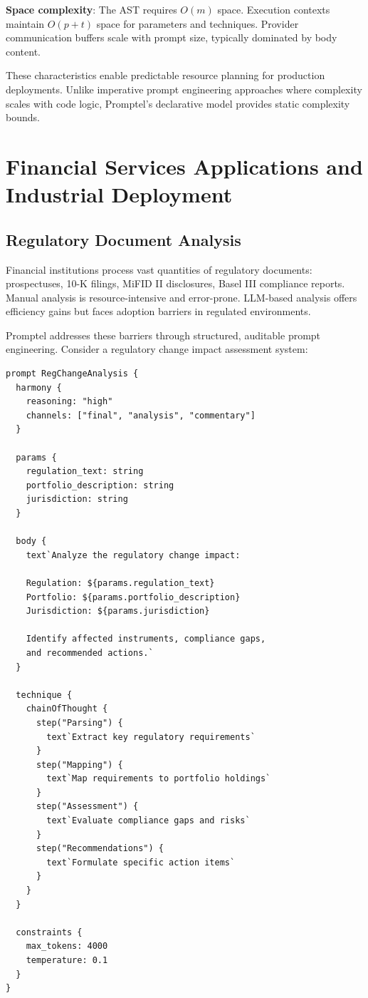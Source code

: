 \documentclass[11pt,a4paper]{article}
\begin{document}
\textbf{Space complexity}: The AST requires $O(m)$ space. Execution contexts maintain $O(p + t)$ space for parameters and techniques. Provider communication buffers scale with prompt size, typically dominated by body content.

These characteristics enable predictable resource planning for production deployments. Unlike imperative prompt engineering approaches where complexity scales with code logic, Promptel's declarative model provides static complexity bounds.

\section{Financial Services Applications and Industrial Deployment}

\subsection{Regulatory Document Analysis}

Financial institutions process vast quantities of regulatory documents: prospectuses, 10-K filings, MiFID II disclosures, Basel III compliance reports. Manual analysis is resource-intensive and error-prone. LLM-based analysis offers efficiency gains but faces adoption barriers in regulated environments.

Promptel addresses these barriers through structured, auditable prompt engineering. Consider a regulatory change impact assessment system:

\begin{lstlisting}[caption=Regulatory analysis prompt]
prompt RegChangeAnalysis {
  harmony {
    reasoning: "high"
    channels: ["final", "analysis", "commentary"]
  }

  params {
    regulation_text: string
    portfolio_description: string
    jurisdiction: string
  }

  body {
    text`Analyze the regulatory change impact:

    Regulation: ${params.regulation_text}
    Portfolio: ${params.portfolio_description}
    Jurisdiction: ${params.jurisdiction}

    Identify affected instruments, compliance gaps,
    and recommended actions.`
  }

  technique {
    chainOfThought {
      step("Parsing") {
        text`Extract key regulatory requirements`
      }
      step("Mapping") {
        text`Map requirements to portfolio holdings`
      }
      step("Assessment") {
        text`Evaluate compliance gaps and risks`
      }
      step("Recommendations") {
        text`Formulate specific action items`
      }
    }
  }

  constraints {
    max_tokens: 4000
    temperature: 0.1
  }
}
\end{lstlisting}
\end{document}
